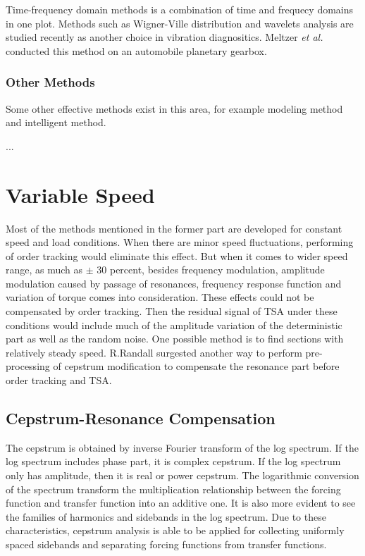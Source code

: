 Time-frequency domain methods is a combination of time and frequecy domains in one plot. Methods such as Wigner-Ville distribution and wavelets analysis are studied recently as another choice in vibration diagnositics. Meltzer \textit{et al.} \cite{mel1} \cite{mel2} conducted this method on an automobile planetary gearbox.

\subsubsection{Other Methods}

Some other effective methods exist in this area, for example modeling method and intelligent method.

...

\section{Variable Speed}

Most of the methods mentioned in the former part are developed for constant speed and load conditions. When there are minor speed fluctuations, performing of order tracking would eliminate this effect. But when it comes to wider speed range, as much as $\pm$ 30 percent, besides frequency modulation, amplitude modulation caused by passage of resonances, frequency response function and variation of torque comes into consideration. These effects could not be compensated by order tracking. Then the residual signal of TSA under these conditions would include much of the amplitude variation of the deterministic part as well as the random noise. \cite{varyspeed} One possible method is to find sections with relatively steady speed. R.Randall \cite{varyspeed} surgested another way to perform pre-processing of cepstrum modification to compensate the resonance part before order tracking and TSA.

\subsection{Cepstrum-Resonance Compensation}

The cepstrum is obtained by inverse Fourier transform of the log spectrum. If the log spectrum includes phase part, it is complex cepstrum. If the log spectrum only has amplitude, then it is real or power cepstrum. The logarithmic conversion of the spectrum transform the multiplication relationship between the forcing function and transfer function into an additive one.\cite{vbcm} It is also more evident to see the families of harmonics and sidebands in the log spectrum. Due to these characteristics, cepstrum analysis is able to be applied for collecting uniformly spaced sidebands and separating forcing functions from transfer functions.

